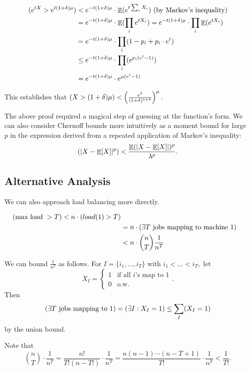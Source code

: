 \documentclass[11pt]{article}
\DeclareMathOperator*{\E}{\mathbb{E}}
\let\Pr\relax
\DeclareMathOperator*{\Pr}{\mathbb{P}}
\begin{document}
\begin{align*}
\Pr(e^{tX} > e^{t(1 + \delta) \mu}) &< e^{-t (1 + \delta) \mu} \cdot \E(e^{t\sum_i X_i}) \text{   (by Markov's inequality)} \\
&= e^{-t (1 + \delta) \mu} \cdot \E(\prod_i e^{t X_i}) = e^{-t (1 + \delta) \mu} \cdot \prod_i \E( e^{t X_i}) \\
&= e^{-t (1 + \delta) \mu} \cdot \prod_i (1 - p_i + p_i \cdot e^t) \\
&\leq e^{-t (1 + \delta) \mu} \cdot \prod_i (e^{p_i (e^t - 1)}) \\
&= e^{-t (1 + \delta) \mu} \cdot e^{\mu(e^t - 1)}
\end{align*}

This establishes that $\Pr(X > (1 + \delta) \mu) < \left(\frac{e^\delta}{(1 + \delta)^{1 + \delta}}\right)^\mu.$

The above proof required a magical step of guessing at the function's form. We can also consider Chernoff bounds more intuitively as a moment bound for large $p$ in the expression derived from a repeated application of Markov's inequality: $$\Pr(|X - \E[X]|^p) < \frac{\E(|X - \E[X]|)^p}{\lambda^p}.$$

\subsection{Alternative Analysis}

We can also approach load balancing more directly.

\begin{align*}
\Pr{(\text{max load } > T)} < n \cdot \Pr(load(1) > T) \\
&= n \cdot \Pr(\exists T \text{ jobs mapping to machine 1}) \\
&< n \cdot \binom{n}{T} \frac{1}{n^T}
\end{align*}

We can bound $\frac{1}{n^T}$ as follows. For $I = \{i_1, \dots, i_T\}$ with $i_1 < \dots < i_T,$ let $$X_I = \begin{cases} 1 & \text{if all $i$'s map to 1} \\ 0 & \text{o.w.}\end{cases}.$$ Then $$\Pr(\exists T \text{ jobs mapping to } 1) = \Pr(\exists I : X_I = 1) \leq \sum_I \Pr(X_I = 1)$$ by the union bound.

Note that $$\binom{n}{T} \cdot \frac{1}{n^T} = \frac{n!}{T!(n-T!)}\cdot \frac{1}{n^T} = \frac{n(n-1) \cdots (n-T+1)}{T!} \cdot \frac{1}{n^T} < \frac{1}{T!}.$$ 
\end{document}
